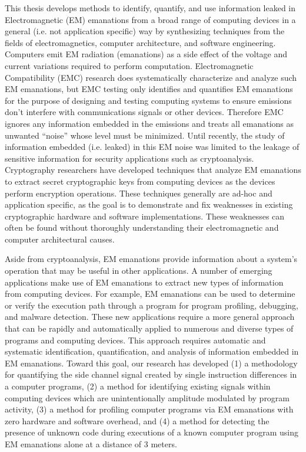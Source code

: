 \documentclass[12pt]{gatech-thesis}
\makeatletter
\newcommand*{\ie}{i.e.\@\xspace}
\makeatother
\begin{document}
\begin{preliminary}
\begin{summary}
This thesis develops methods to identify, quantify, and use information leaked in Electromagnetic (EM) emanations from a broad range of computing devices in a general (\ie not application specific) way by synthesizing techniques from the fields of electromagnetics, computer architecture, and software engineering. Computers emit EM radiation (emanations) as a side effect of the voltage and current variations required to perform computation. Electromagnetic Compatibility (EMC) research does systematically characterize and analyze such EM emanations, but EMC testing only identifies and quantifies EM emanations for the purpose of designing and testing computing systems to ensure emissions don't interfere with communications signals or other devices. Therefore EMC ignores any information embedded in the emissions and treats all emanations as unwanted ``noise'' whose level must be minimized. Until recently, the study of information embedded (\ie leaked) in this EM noise was limited to the leakage of sensitive information for security applications such as cryptoanalysis. Cryptography researchers have developed techniques that analyze EM emanations to extract secret cryptographic keys from computing devices as the devices perform encryption operations. These techniques generally are ad-hoc and application specific, as the goal is to demonstrate and fix weaknesses in existing cryptographic hardware and software implementations. These weaknesses can often be found without thoroughly understanding their electromagnetic and computer architectural causes. 

Aside from cryptoanalysis, EM emanations provide information about a system's operation that may be useful in other applications. A number of emerging applications make use of EM emanations to extract new types of information from computing devices. For example, EM emanations can be used to determine or verify the execution path through a program for program profiling, debugging, and malware detection. These new applications require a more general approach that can be rapidly and automatically applied to numerous and diverse types of programs and computing devices. This approach requires automatic and systematic identification, quantification, and analysis of information embedded in EM emanations. Toward this goal, our research has developed (1) a methodology for quantifying the side channel signal created by single instruction differences in a computer programs, (2) a method for identifying existing signals within computing devices which are unintentionally amplitude modulated by program activity, (3) a method for profiling computer programs via EM emanations with zero hardware and software overhead, and (4) a method for detecting the presence of unknown code during executions of a known computer program using EM emanations alone at a distance of 3 meters. 

\end{summary}
\end{preliminary}
\end{document}
